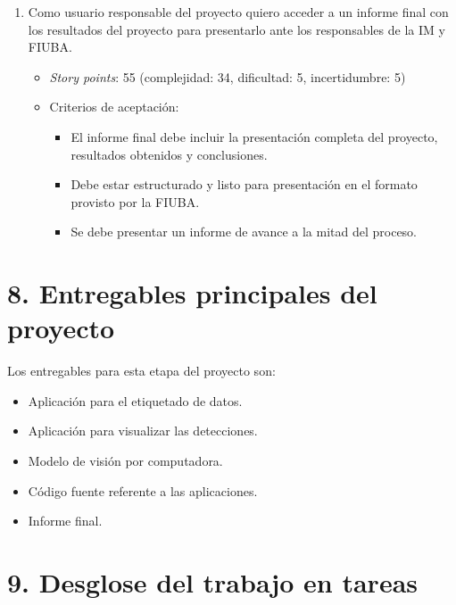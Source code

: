 \documentclass[
11pt, %
]{charter}
\begin{document}
\begin{enumerate}
  \item Como usuario responsable del proyecto quiero acceder a un informe final con los resultados del proyecto para presentarlo ante los responsables de la IM y FIUBA.
        \begin{itemize}
          \item \textit{Story points}: 55 (complejidad: 34, dificultad: 5, incertidumbre: 5)
          \item Criterios de aceptación:
                \begin{itemize}
                  \item El informe final debe incluir la presentación completa del proyecto, resultados obtenidos y conclusiones.
                  \item Debe estar estructurado y listo para presentación en el formato provisto por la FIUBA.
                  \item Se debe presentar un informe de avance a la mitad del proceso.
                \end{itemize}
        \end{itemize}
\end{enumerate}

\section{8. Entregables principales del proyecto}
\label{sec:entregables}

Los entregables para esta etapa del proyecto son:

\begin{itemize}
  \item Aplicación para el etiquetado de datos.
  \item Aplicación para visualizar las detecciones.
  \item Modelo de visión por computadora.
  \item Código fuente referente a las aplicaciones.
  \item Informe final.
\end{itemize}

\section{9. Desglose del trabajo en tareas}
\label{sec:wbs}
\end{document}
